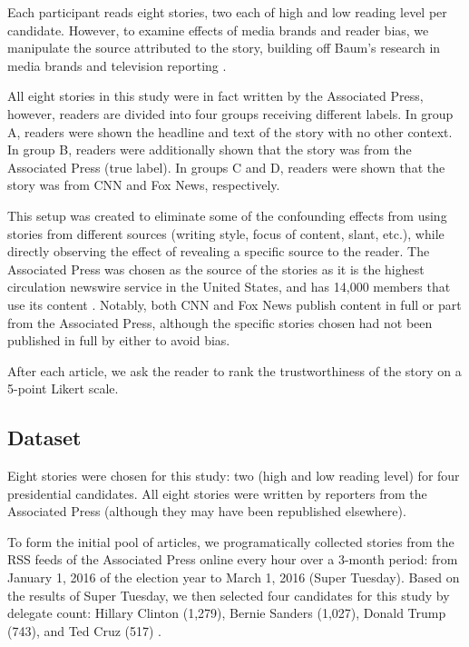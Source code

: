 Each participant reads eight stories, two each of high and low reading level per candidate. However, to examine effects of media brands and reader bias, we manipulate the source attributed to the story, building off Baum's research in media brands and television reporting \cite{baum2008eye}.

All eight stories in this study were in fact written by the Associated Press, however, readers are divided into four groups receiving different labels. In group A, readers were shown the headline and text of the story with no other context. In group B, readers were additionally shown that the story was from the Associated Press (true label). In groups C and D, readers were shown that the story was from CNN and Fox News, respectively.

This setup was created to eliminate some of the confounding effects from using stories from different sources (writing style, focus of content, slant, etc.), while directly observing the effect of revealing a specific source to the reader. The Associated Press was chosen as the source of the stories as it is the highest circulation newswire service in the United States, and has 14,000 members that use its content \cite{apFAQ}. Notably, both CNN and Fox News publish content in full or part from the Associated Press, although the specific stories chosen had not been published in full by either to avoid bias.

After each article, we ask the reader to rank the trustworthiness of the story on a 5-point Likert scale.

\subsection{Dataset} 

Eight stories were chosen for this study: two (high and low reading level) for four presidential candidates. All eight stories were written by reporters from the Associated Press (although they may have been republished elsewhere).

To form the initial pool of articles, we programatically collected stories from the RSS feeds of the Associated Press online every hour over a 3-month period: from January 1, 2016 of the election year to March 1, 2016 (Super Tuesday). 
Based on the results of Super Tuesday, we then selected four candidates for this study by delegate count: Hillary Clinton (1,279), Bernie Sanders (1,027), Donald Trump (743), and Ted Cruz (517) \cite{March45online}.

